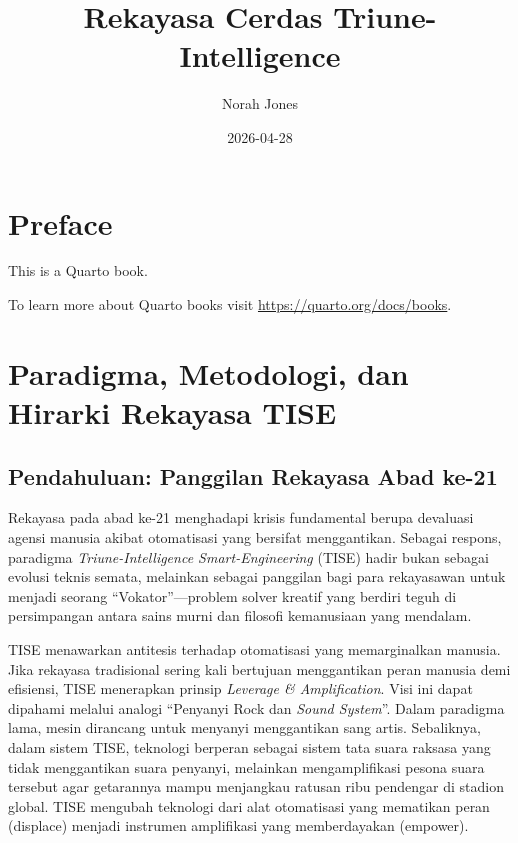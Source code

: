 \documentclass[
  letterpaper,
  DIV=11,
  numbers=noendperiod]{scrreprt}
\title{Rekayasa Cerdas Triune-Intelligence}
\author{Norah Jones}
\date{2026-04-28}
\renewcommand*\contentsname{Table of contents}
\newcommand\contentsname{Table of contents}
\begin{document}
\maketitle

\renewcommand*\contentsname{Table of contents}
{
\setcounter{tocdepth}{2}
\tableofcontents
}


\chapter*{Preface}\label{preface}


This is a Quarto book.

To learn more about Quarto books visit
\url{https://quarto.org/docs/books}.


\chapter{Paradigma, Metodologi, dan Hirarki Rekayasa
TISE}\label{paradigma-metodologi-dan-hirarki-rekayasa-tise}

\section{Pendahuluan: Panggilan Rekayasa Abad
ke-21}\label{pendahuluan-panggilan-rekayasa-abad-ke-21}

Rekayasa pada abad ke-21 menghadapi krisis fundamental berupa devaluasi
agensi manusia akibat otomatisasi yang bersifat menggantikan. Sebagai
respons, paradigma \emph{Triune-Intelligence Smart-Engineering} (TISE)
hadir bukan sebagai evolusi teknis semata, melainkan sebagai panggilan
bagi para rekayasawan untuk menjadi seorang ``Vokator''---problem solver
kreatif yang berdiri teguh di persimpangan antara sains murni dan
filosofi kemanusiaan yang mendalam.

TISE menawarkan antitesis terhadap otomatisasi yang memarginalkan
manusia. Jika rekayasa tradisional sering kali bertujuan menggantikan
peran manusia demi efisiensi, TISE menerapkan prinsip \emph{Leverage \&
Amplification}. Visi ini dapat dipahami melalui analogi ``Penyanyi Rock
dan \emph{Sound System}''. Dalam paradigma lama, mesin dirancang untuk
menyanyi menggantikan sang artis. Sebaliknya, dalam sistem TISE,
teknologi berperan sebagai sistem tata suara raksasa yang tidak
menggantikan suara penyanyi, melainkan mengamplifikasi pesona suara
tersebut agar getarannya mampu menjangkau ratusan ribu pendengar di
stadion global. TISE mengubah teknologi dari alat otomatisasi yang
mematikan peran (displace) menjadi instrumen amplifikasi yang
memberdayakan (empower).
\end{document}
